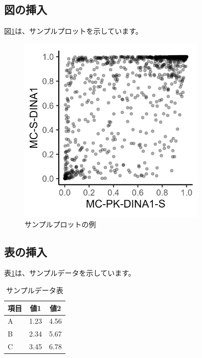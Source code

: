 \documentclass[../main/main.tex]{subfiles}
\begin{document}
\subsection{図の挿入}

図\ref{fig:sample_plot}は、サンプルプロットを示しています。

\begin{figure}[htbp]
    \centering
    \includegraphics[width=0.8\textwidth]{../images/Chap_A/demo_plot.png}
    \caption{サンプルプロットの例}
    \label{fig:sample_plot}
\end{figure}

\subsection{表の挿入}

表\ref{tab:sample_table}は、サンプルデータを示しています。

\begin{table}[htbp]
    \centering
    \caption{サンプルデータ表}
    \label{tab:sample_table}
    \begin{tabular}{lcc}
        \hline
        項目 & 値1 & 値2 \\
        \hline
        A & 1.23 & 4.56 \\
        B & 2.34 & 5.67 \\
        C & 3.45 & 6.78 \\
        \hline
    \end{tabular}
\end{table}
\end{document}
